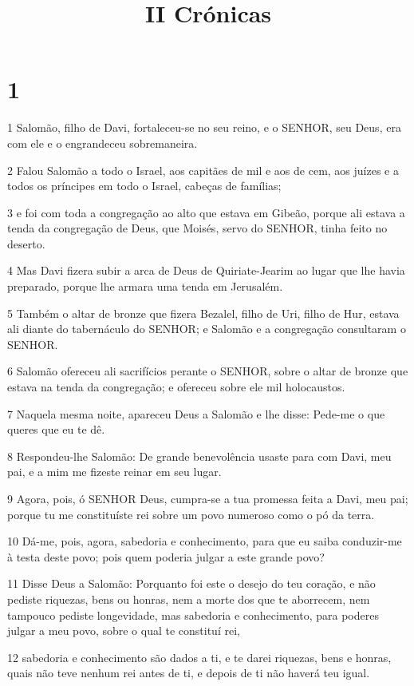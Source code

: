 

\title{II Crónicas}


\chapter{1}

\par 1 Salomão, filho de Davi, fortaleceu-se no seu reino, e o SENHOR, seu Deus, era com ele e o engrandeceu sobremaneira.
\par 2 Falou Salomão a todo o Israel, aos capitães de mil e aos de cem, aos juízes e a todos os príncipes em todo o Israel, cabeças de famílias;
\par 3 e foi com toda a congregação ao alto que estava em Gibeão, porque ali estava a tenda da congregação de Deus, que Moisés, servo do SENHOR, tinha feito no deserto.
\par 4 Mas Davi fizera subir a arca de Deus de Quiriate-Jearim ao lugar que lhe havia preparado, porque lhe armara uma tenda em Jerusalém.
\par 5 Também o altar de bronze que fizera Bezalel, filho de Uri, filho de Hur, estava ali diante do tabernáculo do SENHOR; e Salomão e a congregação consultaram o SENHOR.
\par 6 Salomão ofereceu ali sacrifícios perante o SENHOR, sobre o altar de bronze que estava na tenda da congregação; e ofereceu sobre ele mil holocaustos.
\par 7 Naquela mesma noite, apareceu Deus a Salomão e lhe disse: Pede-me o que queres que eu te dê.
\par 8 Respondeu-lhe Salomão: De grande benevolência usaste para com Davi, meu pai, e a mim me fizeste reinar em seu lugar.
\par 9 Agora, pois, ó SENHOR Deus, cumpra-se a tua promessa feita a Davi, meu pai; porque tu me constituíste rei sobre um povo numeroso como o pó da terra.
\par 10 Dá-me, pois, agora, sabedoria e conhecimento, para que eu saiba conduzir-me à testa deste povo; pois quem poderia julgar a este grande povo?
\par 11 Disse Deus a Salomão: Porquanto foi este o desejo do teu coração, e não pediste riquezas, bens ou honras, nem a morte dos que te aborrecem, nem tampouco pediste longevidade, mas sabedoria e conhecimento, para poderes julgar a meu povo, sobre o qual te constituí rei,
\par 12 sabedoria e conhecimento são dados a ti, e te darei riquezas, bens e honras, quais não teve nenhum rei antes de ti, e depois de ti não haverá teu igual.
